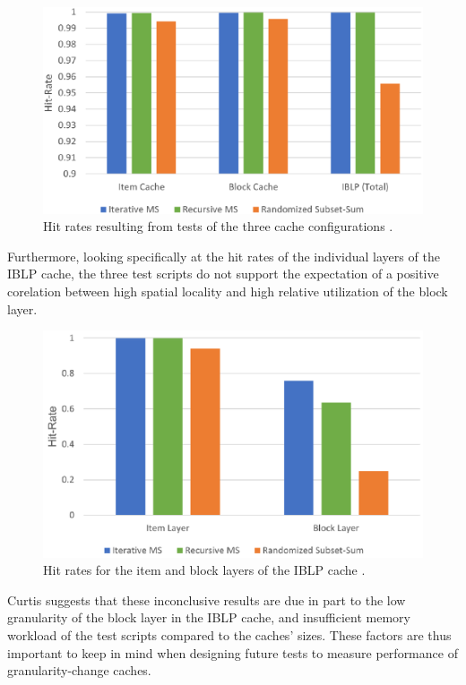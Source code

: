 \documentclass[12pt,twoside]{reedthesis}
\begin{document}
	\begin{figure}[h]
		\centering
		\includegraphics[width=4.8in]{figures/curtis_cache_hit_rates.png}
		\caption{Hit rates resulting from tests of the three cache configurations \cite{curtis}.}
	\end{figure}

	Furthermore, looking specifically at the hit rates of the individual layers of the IBLP cache, the three test scripts do not support the expectation of a positive corelation between high spatial locality and high relative utilization of the block layer.

	\begin{figure}[h]
		\centering
		\includegraphics[width=4.5in]{figures/curtis_layer_hit_rates.png}
		\caption{Hit rates for the item and block layers of the IBLP cache \cite{curtis}.}
	\end{figure}

	Curtis suggests that these inconclusive results are due in part to the low granularity of the block layer in the IBLP cache, and insufficient memory workload of the test scripts compared to the caches' sizes. These factors are thus important to keep in mind when designing future tests to measure performance of granularity-change caches.
\end{document}
